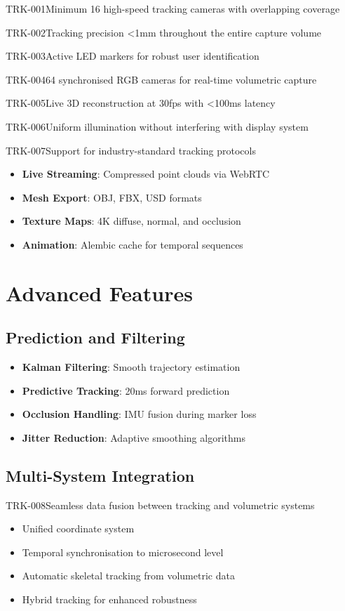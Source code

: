 \begin{requirement}{TRK-001}{Minimum 16 high-speed tracking cameras with overlapping coverage}
\begin{requirement}{TRK-002}{Tracking precision <1mm throughout the entire capture volume}
\begin{requirement}{TRK-003}{Active LED markers for robust user identification}
\begin{requirement}{TRK-004}{64 synchronised RGB cameras for real-time volumetric capture}
\begin{requirement}{TRK-005}{Live 3D reconstruction at 30fps with <100ms latency}
\begin{requirement}{TRK-006}{Uniform illumination without interfering with display system}
\begin{requirement}{TRK-007}{Support for industry-standard tracking protocols}
\begin{itemize}
    \item \textbf{Live Streaming}: Compressed point clouds via WebRTC
    \item \textbf{Mesh Export}: OBJ, FBX, USD formats
    \item \textbf{Texture Maps}: 4K diffuse, normal, and occlusion
    \item \textbf{Animation}: Alembic cache for temporal sequences
\end{itemize}

\section{Advanced Features}

\subsection{Prediction and Filtering}

\begin{itemize}
    \item \textbf{Kalman Filtering}: Smooth trajectory estimation
    \item \textbf{Predictive Tracking}: 20ms forward prediction
    \item \textbf{Occlusion Handling}: IMU fusion during marker loss
    \item \textbf{Jitter Reduction}: Adaptive smoothing algorithms
\end{itemize}

\subsection{Multi-System Integration}

\begin{requirement}{TRK-008}{Seamless data fusion between tracking and volumetric systems}

\begin{itemize}
    \item Unified coordinate system
    \item Temporal synchronisation to microsecond level
    \item Automatic skeletal tracking from volumetric data
    \item Hybrid tracking for enhanced robustness
\end{itemize}


\end{requirement}
\end{requirement}
\end{requirement}
\end{requirement}
\end{requirement}
\end{requirement}
\end{requirement}
\end{requirement}
